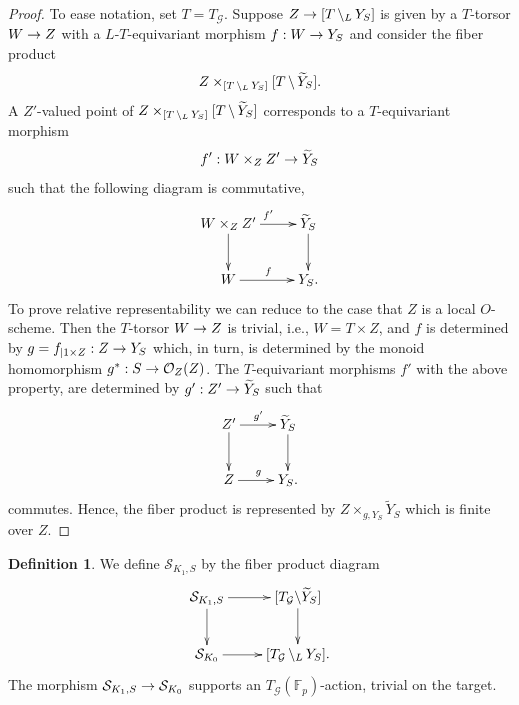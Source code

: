\documentclass[reqno, 10pt]{amsart}
\makeatletter
\newcommand{\BF}{\ensuremath{\mathbb {F}}\xspace}
\newcommand{\CG}{\ensuremath{\mathcal {G}}\xspace}
\newcommand{\CO}{\ensuremath{\mathcal {O}}\xspace}
\newcommand{\CS}{\ensuremath{\mathcal {S}}\xspace}
\newcommand{\wt}{\widetilde}
\newcommand{\bs}{\backslash}
\theoremstyle{definition}
\newtheorem{definition}[subsubsection]{Definition}
\numberwithin{equation}{subsection}
\numberwithin{subsubsection}{subsection}
\renewcommand{\to}{%
   \ifbool{@display}{\longrightarrow}{\rightarrow}%
   }
\newcommand{\LBS}{\, {\bs}_{\vphantom{A}{L}}\, }
\makeatother
\begin{document}
  \begin{proof} To ease notation, set $T=T_\CG$. Suppose $Z\to [T\LBS Y_S]$ is given by a $T$-torsor $W\to Z$ with a $L$-$T$-equivariant morphism $f: W\to Y_S$ and consider the fiber product
\[
Z\times_{[T  \LBS Y_S]}[T\,\bs\, \wt Y_S].
\]
 A $Z'$-valued point of $Z\times_{[T  \LBS Y_S]}[T\,\bs\, \wt Y_S]$ corresponds to a $T$-equivariant morphism
\[
f': W\times_Z Z'\to \wt Y_S
\]
such that  the following diagram is commutative,
\begin{equation} 
\begin{aligned}
 \xymatrix{
    W\times_Z Z' \ar[r]^{f'} \ar[d]  &   \wt  Y_S  \ar[d] \\
     W \ar[r]^{f}  & Y_S.
        }
        \end{aligned}
\end{equation}
 To prove relative representability we can reduce to the case that $Z$ is a local $O$-scheme. Then the $T$-torsor $W\to Z$ is trivial, i.e., $W=T\times Z$, and $f$ is determined by $g=f_{|1\times Z}: Z\to Y_S$ which, in turn, is  determined  by the monoid homomorphism $g^*: S\to \CO_Z(Z)$. The $T$-equivariant morphisms $f'$ with the above property, are determined by $g': Z'\to \wt Y_S$ such that
 \begin{equation} 
\begin{aligned}
 \xymatrix{
   Z' \ar[r]^{g'} \ar[d]  &   \wt  Y_S  \ar[d] \\
     Z \ar[r]^{g}  & Y_S.
        }
        \end{aligned}
\end{equation}
commutes. Hence, the fiber product is represented by $Z\times_{g,Y_S}\wt Y_S$ which is finite over $Z$.
\end{proof}

 \begin{definition}\label{def:generalconstruction2} We  define $\CS_{K_1, S}$ by the fiber product diagram
\begin{equation}\label{def:Fiberprod}
\begin{aligned}
 \xymatrix{
      \CS_{K_1,S } \ar[r] \ar[d]  &  [T_\CG \bs \wt Y_S ] \ar[d]  \\
       \CS_{K_0}\ar[r]  & [T_\CG \LBS Y_S ].
        }
        \end{aligned}
\end{equation}
The morphism $ \CS_{K_1,S }\to \CS_{K_0}$ supports an $T_\CG(\BF_p)$-action, trivial on the target.
 \end{definition}
 
\end{document}
